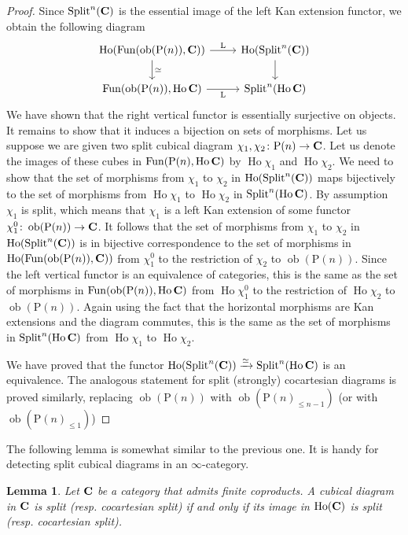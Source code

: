 \documentclass[psamsfonts]{amsart}
\theoremstyle{plain}
\newtheorem{lem}[thm]{Lemma}
\theoremstyle{definition}
\theoremstyle{remark}
\newcommand{\catname}[1]{{\normalfont\textbf{#1}}}
\newcommand{\ob}{\operatorname{ob}}
\newcommand{\lkan}{\mathrm{L}}
\newcommand{\power}{\mathrm{P}}
\DeclareMathOperator{\fun}{Fun}
\DeclareMathOperator{\splitcube}{Split}
\DeclareMathOperator{\ho}{Ho}
\begin{document}
\begin{proof}
Since $\splitcube^n(\catname{C})$ is the essential image of the left Kan extension functor, we obtain the following diagram
\[
\begin{tikzcd}
	\ho(\fun(\ob(\power(n)), \catname{C})) & \ho(\splitcube^n(\catname{C})) \\
	{\fun(\ob(\power(n)), \ho\catname{C})} & {\splitcube^n(\ho\catname{C})}
	\arrow["\lkan", from=1-1, to=1-2]
	\arrow["\simeq", from=1-1, to=2-1]
	\arrow[ from=1-2, to=2-2]
	\arrow["\lkan"', from=2-1, to=2-2]
\end{tikzcd}
\]
We have shown that the right vertical functor is essentially surjective on objects. It remains to show that it induces a bijection on sets of morphisms. Let us suppose we are given two split cubical diagram $\chi_1, \chi_2\colon \power(n) \to \catname{C}$. Let us denote the images of these cubes in $\fun(\power(n), \ho\catname{C})$ by $\ho\chi_1$ and $\ho\chi_2$. We need to show that the set of morphisms from $\chi_1$ to $\chi_2$ in $\ho(\splitcube^n(\catname{C}))$ maps bijectively to the set of morphisms from $\ho\chi_1$ to $\ho\chi_2$ in $\splitcube^n(\ho\catname{C})$. By assumption $\chi_1$ is split, which means that $\chi_1$ is a left Kan extension of some functor $\chi^0_1\colon \ob(\power(n))\to \catname{C}$. It follows that the set of morphisms from $\chi_1$ to $\chi_2$ in $\ho(\splitcube^n(\catname{C}))$ is in bijective correspondence to the set of morphisms in $\ho(\fun(\ob(\power(n)), \catname{C}))$ from $\chi^0_1$ to the restriction of $\chi_2$ to $\ob(\power(n))$. Since the left vertical functor is an equivalence of categories, this is the same as the set of morphisms in $\fun(\ob(\power(n)), \ho\catname{C})$ from $\ho\chi^0_1$ to the restriction of $\ho\chi_2$ to $\ob(\power(n))$. Again using the fact that the horizontal morphisms are Kan extensions and the diagram commutes, this is the same as the set of morphisms in $\splitcube^n(\ho\catname{C})$ from $\ho\chi_1$ to $\ho\chi_2$.

We have proved that the functor $\ho(\splitcube^n(\catname{C}))\xrightarrow{\simeq} \splitcube^n(\ho\catname{C})$ is an equivalence. The analogous statement for split (strongly) cocartesian diagrams is proved similarly, replacing $\ob(\power(n))$ with $\ob(\power(n)_{\le n-1})$ (or with $\ob(\power(n)_{\le 1})$)
\end{proof}
The following lemma is somewhat similar to the previous one. It is handy for detecting split cubical diagrams in an $\infty$-category.
\begin{lem}\label{lemma:lift}
Let $\catname{C}$ be a category that admits finite coproducts. A cubical diagram in $\catname{C}$ is split (resp. cocartesian split) if and only if its image in $\ho(\catname{C})$ is split (resp. cocartesian split).
\end{lem} 
\end{document}
